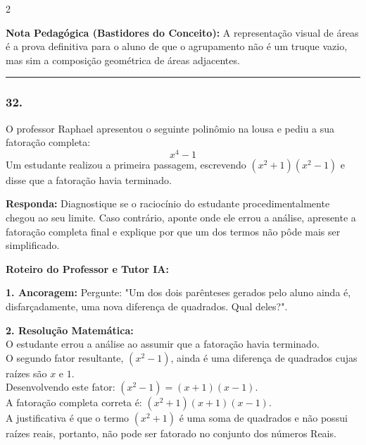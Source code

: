 \begin{multicols*}{2}
    \begin{boxexplicacao}
    \textbf{Nota Pedagógica (Bastidores do Conceito):} A representação visual de áreas é a prova definitiva para o aluno de que o agrupamento não é um truque vazio, mas sim a composição geométrica de áreas adjacentes.
    \end{boxexplicacao}
\fi

\par\vspace{\espacoQuestao}

\noindent\textcolor{CorLinha}{\rule{\linewidth}{0.5pt}} 
\par\vspace{\espacoPreQuestao}
\subsubsection*{32.} 
\begin{enunciadoLiteral}
O professor Raphael apresentou o seguinte polinômio na lousa e pediu a sua fatoração completa:
$$x^4 - 1$$
Um estudante realizou a primeira passagem, escrevendo $(x^2 + 1)(x^2 - 1)$ e disse que a fatoração havia terminado.

\begin{boxresponda}
\textbf{Responda:} Diagnostique se o raciocínio do estudante procedimentalmente chegou ao seu limite. Caso contrário, aponte onde ele errou a análise, apresente a fatoração completa final e explique por que um dos termos não pôde mais ser simplificado.
\end{boxresponda}
\end{enunciadoLiteral}

\ifgabarito
    \begin{tcolorbox}[colback=CorTitUm!5, colframe=CorTitUm, boxrule=1pt, arc=4pt, left=6pt, right=6pt, top=6pt, bottom=6pt]
    \small\textbf{\textcolor{CorTitUm}{Roteiro do Professor e Tutor IA:}}\par\vspace{0.1cm}
    \color{CinzaEscuro}
    \textbf{1. Ancoragem:} Pergunte: "Um dos dois parênteses gerados pelo aluno ainda é, disfarçadamente, uma nova diferença de quadrados. Qual deles?".\par\vspace{0.1cm}
    \textbf{2. Resolução Matemática:}\\
    O estudante errou a análise ao assumir que a fatoração havia terminado.\\
    O segundo fator resultante, $(x^2 - 1)$, ainda é uma diferença de quadrados cujas raízes são $x$ e $1$.\\
    Desenvolvendo este fator: $(x^2 - 1) = (x + 1)(x - 1)$.\\
    A fatoração completa correta é: $(x^2 + 1)(x + 1)(x - 1)$.\\
    A justificativa é que o termo $(x^2 + 1)$ é uma soma de quadrados e não possui raízes reais, portanto, não pode ser fatorado no conjunto dos números Reais.
    \end{tcolorbox}
    \vspace{0.15cm}
    

\end{multicols*}
